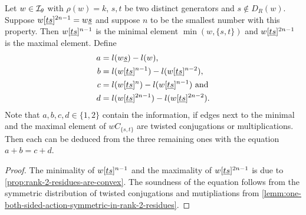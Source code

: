 \begin{coro}
	Let $w \in \mathcal{I}_{\theta}$ with $\rho(w) = k$, $s,t$ be two distinct generators and $s \notin D_R(w)$. Suppose $w[\underline{t} \underline{s}]^{2n-1} = w \underline{s}$ and suppose $n$ to be the smallest number with this property. Then $w[\underline{t} \underline{s}]^{n-1}$ is the minimal element $\min(w,\{s,t\})$ and $w[\underline{t} \underline{s}]^{2n-1}$ is the maximal element. Define
	\begin{align*}
		a & = l(w \underline{s}) - l(w), \\
		b & = l(w[\underline{t} \underline{s}]^{n-1}) - l(w[\underline{t} \underline{s}]^{n-2}), \\
		c & = l(w[\underline{t} \underline{s}]^{n}) - l(w[\underline{t} \underline{s}]^{n-1}) \textrm{ and} \\
		d & = l(w[\underline{t} \underline{s}]^{2n-1}) - l(w[\underline{t} \underline{s}]^{2n-2}).
	\end{align*}
	Note that $a,b,c,d \in \{1,2\}$ contain the information, if edges next to the minimal and the maximal element of $wC_{\{s,t\}}$ are twisted conjugations or multiplications. Then each can be deduced from the three remaining ones with the equation $a+b=c+d$.

	\begin{proof}
		The minimality of $w[\underline{t} \underline{s}]^{n-1}$ and the maximality of $w[\underline{t} \underline{s}]^{2n-1}$ is due to \ref{prop:rank-2-residues-are-convex}. The soundness of the equation follows from the symmetric distribution of twisted conjugations and mutipliations from \ref{lemm:one-both-sided-action-symmetric-in-rank-2-residues}.
	\end{proof}
\end{coro}


